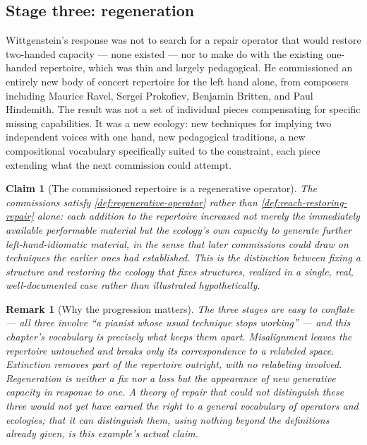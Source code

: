 \documentclass[12pt]{report}
\newtheorem{claim}[definition]{Claim}
\newtheorem{remark}[definition]{Remark}
\begin{document}
\subsection*{Stage three: regeneration}

Wittgenstein's response was not to search for a repair operator that
would restore two-handed capacity --- none existed --- nor to make do
with the existing one-handed repertoire, which was thin and largely
pedagogical. He commissioned an entirely new body of concert repertoire
for the left hand alone, from composers including Maurice Ravel, Sergei
Prokofiev, Benjamin Britten, and Paul Hindemith. The result was not a
set of individual pieces compensating for specific missing
capabilities. It was a new ecology: new techniques for implying two
independent voices with one hand, new pedagogical traditions, a new
compositional vocabulary specifically suited to the constraint, each
piece extending what the next commission could attempt.

\begin{claim}[The commissioned repertoire is a regenerative operator]
\label{claim:wittgenstein-regenerative}
The commissions satisfy \cref{def:regenerative-operator} rather than
\cref{def:reach-restoring-repair} alone: each addition to the
repertoire increased not merely the immediately available performable
material but the ecology's own capacity to generate further
left-hand-idiomatic material, in the sense that later commissions could
draw on techniques the earlier ones had established. This is the
distinction between fixing a structure and restoring the ecology that
fixes structures, realized in a single, real, well-documented case
rather than illustrated hypothetically.
\end{claim}

\begin{remark}[Why the progression matters]
The three stages are easy to conflate --- all three involve ``a pianist
whose usual technique stops working'' --- and this chapter's vocabulary
is precisely what keeps them apart. Misalignment leaves the repertoire
untouched and breaks only its correspondence to a relabeled space.
Extinction removes part of the repertoire outright, with no
relabeling involved. Regeneration is neither a fix nor a loss but the
appearance of new generative capacity in response to one. A theory of
repair that could not distinguish these three would not yet have
earned the right to a general vocabulary of operators and ecologies;
that it can distinguish them, using nothing beyond the definitions
already given, is this example's actual claim.
\end{remark}
\end{document}
